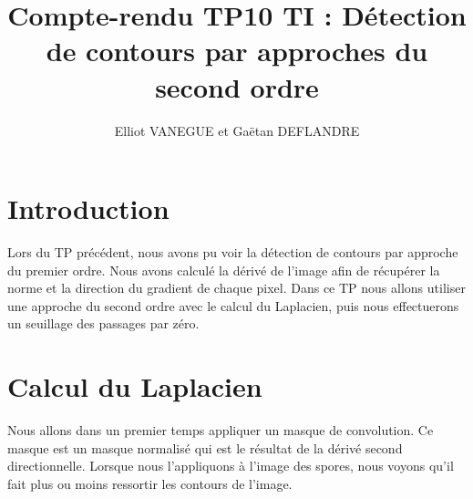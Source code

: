 \documentclass[a4paper,11pt]{article}
\title{Compte-rendu TP10 TI : Détection de contours par approches du second ordre}
\author{Elliot VANEGUE et Gaëtan DEFLANDRE}
\begin{document}


  \maketitle
  
  \mbox{}
  \newpage
  \clearpage
  
  \section{Introduction}
   Lors du TP précédent, nous avons pu voir la détection de contours par approche du premier ordre. Nous avons
   calculé la dérivé de l'image afin de récupérer la norme et la direction du gradient de chaque pixel. Dans ce TP
   nous allons utiliser une approche du second ordre avec le calcul du Laplacien, puis nous effectuerons un seuillage
   des passages par zéro.

  \section{Calcul du Laplacien}
  Nous allons dans un premier temps appliquer un masque de convolution. Ce masque est un masque normalisé
  qui est le résultat de la dérivé second directionnelle. Lorsque nous l'appliquons à l'image des spores, nous
  voyons qu'il fait plus ou moins ressortir les contours de l'image.\\
  
\end{document}
